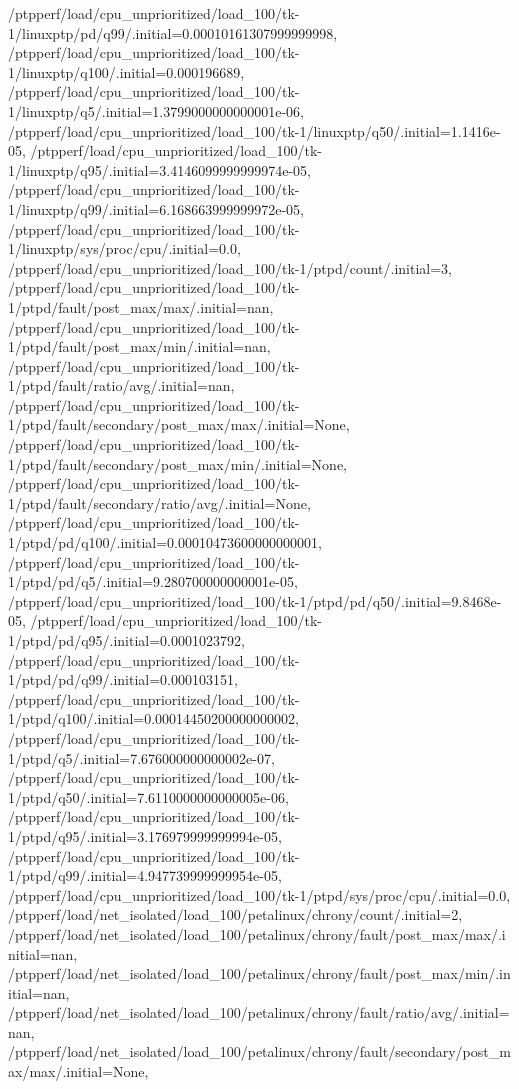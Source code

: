 {    /ptpperf/load/cpu_unprioritized/load_100/tk-1/linuxptp/pd/q99/.initial=0.00010161307999999998,
    /ptpperf/load/cpu_unprioritized/load_100/tk-1/linuxptp/q100/.initial=0.000196689,
    /ptpperf/load/cpu_unprioritized/load_100/tk-1/linuxptp/q5/.initial=1.3799000000000001e-06,
    /ptpperf/load/cpu_unprioritized/load_100/tk-1/linuxptp/q50/.initial=1.1416e-05,
    /ptpperf/load/cpu_unprioritized/load_100/tk-1/linuxptp/q95/.initial=3.4146099999999974e-05,
    /ptpperf/load/cpu_unprioritized/load_100/tk-1/linuxptp/q99/.initial=6.168663999999972e-05,
    /ptpperf/load/cpu_unprioritized/load_100/tk-1/linuxptp/sys/proc/cpu/.initial=0.0,
    /ptpperf/load/cpu_unprioritized/load_100/tk-1/ptpd/count/.initial=3,
    /ptpperf/load/cpu_unprioritized/load_100/tk-1/ptpd/fault/post_max/max/.initial=nan,
    /ptpperf/load/cpu_unprioritized/load_100/tk-1/ptpd/fault/post_max/min/.initial=nan,
    /ptpperf/load/cpu_unprioritized/load_100/tk-1/ptpd/fault/ratio/avg/.initial=nan,
    /ptpperf/load/cpu_unprioritized/load_100/tk-1/ptpd/fault/secondary/post_max/max/.initial=None,
    /ptpperf/load/cpu_unprioritized/load_100/tk-1/ptpd/fault/secondary/post_max/min/.initial=None,
    /ptpperf/load/cpu_unprioritized/load_100/tk-1/ptpd/fault/secondary/ratio/avg/.initial=None,
    /ptpperf/load/cpu_unprioritized/load_100/tk-1/ptpd/pd/q100/.initial=0.00010473600000000001,
    /ptpperf/load/cpu_unprioritized/load_100/tk-1/ptpd/pd/q5/.initial=9.280700000000001e-05,
    /ptpperf/load/cpu_unprioritized/load_100/tk-1/ptpd/pd/q50/.initial=9.8468e-05,
    /ptpperf/load/cpu_unprioritized/load_100/tk-1/ptpd/pd/q95/.initial=0.0001023792,
    /ptpperf/load/cpu_unprioritized/load_100/tk-1/ptpd/pd/q99/.initial=0.000103151,
    /ptpperf/load/cpu_unprioritized/load_100/tk-1/ptpd/q100/.initial=0.00014450200000000002,
    /ptpperf/load/cpu_unprioritized/load_100/tk-1/ptpd/q5/.initial=7.676000000000002e-07,
    /ptpperf/load/cpu_unprioritized/load_100/tk-1/ptpd/q50/.initial=7.6110000000000005e-06,
    /ptpperf/load/cpu_unprioritized/load_100/tk-1/ptpd/q95/.initial=3.176979999999994e-05,
    /ptpperf/load/cpu_unprioritized/load_100/tk-1/ptpd/q99/.initial=4.947739999999954e-05,
    /ptpperf/load/cpu_unprioritized/load_100/tk-1/ptpd/sys/proc/cpu/.initial=0.0,
    /ptpperf/load/net_isolated/load_100/petalinux/chrony/count/.initial=2,
    /ptpperf/load/net_isolated/load_100/petalinux/chrony/fault/post_max/max/.initial=nan,
    /ptpperf/load/net_isolated/load_100/petalinux/chrony/fault/post_max/min/.initial=nan,
    /ptpperf/load/net_isolated/load_100/petalinux/chrony/fault/ratio/avg/.initial=nan,
    /ptpperf/load/net_isolated/load_100/petalinux/chrony/fault/secondary/post_max/max/.initial=None,
}
